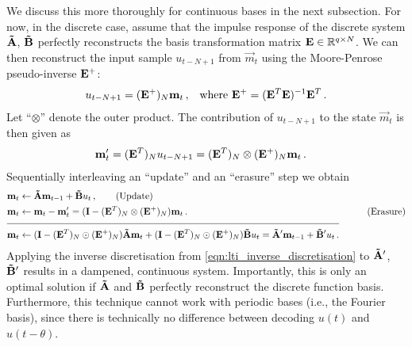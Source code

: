 We discuss this more thoroughly for continuous bases in the next subsection.
For now, in the discrete case, assume that the impulse response of the discrete \LTI system $\mathbf{\tilde A}$, $\mathbf{\tilde B}$ perfectly reconstructs the basis transformation matrix $\mathbf{E} \in \mathbb{R}^{q \times N}$.
We can then reconstruct the input sample $u_{t - N + 1}$ from $\vec m_t$ using the Moore-Penrose pseudo-inverse $\mathbf{E}^+$:
\begin{align*}
	u_{t - N + 1} &= (\mathbf{E}^+)_{N} \mathbf{m}_t \,, & \text{where } \mathbf{E}^+ = (\mathbf{E}^T \mathbf{E})^{-1} \mathbf{E}^T\,.
\end{align*}
Let \enquote{$\otimes$} denote the outer product.
The contribution of $u_{t - N + 1}$ to the state $\vec m_t$ is then given as
\begin{align*}
 	\mathbf{m}'_t &= ( \mathbf{E}^T)_N u_{t - N + 1} = ( \mathbf{E}^T)_N \otimes (\mathbf{E}^+)_N\mathbf{m}_t \,.
\end{align*}
Sequentially interleaving an \enquote{update} and an \enquote{erasure} step we obtain
\begin{align}
 	\vec m_t &\gets \mat{\tilde A} \vec m_{t - 1} + \mat{\tilde B} u_t \,, \tag{Update}\\
 	\vec m_t &\gets \vec m_t - \vec m'_t = ( \mat I - ( \mat E^T )_N \otimes (\mat E^+)_N ) \vec m_t \,. & \tag{Erasure}\\[-0.5em]
 	\cline{1-2}
 	\vec m_t &\gets
 		(\mat I - ( \mat E^T )_N \odot (\mat E^+)_N ) \mat{\tilde A} \vec m_t
 		+ (\mat I - ( \mat E^T )_N \odot (\mat E^+ )_N ) \mat{\tilde B} u_t
 		=   \mat{{\tilde A}'} \vec m_{t - 1} + \mat{{\tilde B}'} u_t  \,.
	\label{eqn:information_erasure_discrete}
\end{align}
Applying the inverse discretisation from \cref{eqn:lti_inverse_discretisation} to $\mathbf{\tilde A}'$, $\mathbf{\tilde B}'$ results in a dampened, continuous \LTI system.
Importantly, this is only an optimal solution if $\mathbf{\tilde A}$ and $\mathbf{\tilde B}$ perfectly reconstruct the discrete function basis.
Furthermore, this technique cannot work with periodic bases (i.e., the Fourier basis), since there is technically no difference between decoding $u(t)$ and $u(t - \theta)$.


